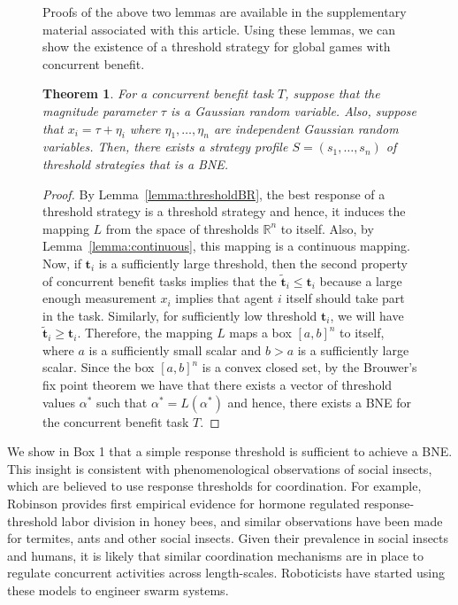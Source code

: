\documentclass{nature}
\newtheorem{theorem}{Theorem}
\def\R{\mathbb{R}}    %
\def\td{\mathbf{t}}   %
\begin{document}
\begin{figure}
\begin{framed}
Proofs of the above two lemmas are available in the supplementary material associated with this article. Using these lemmas, we can show the existence of a threshold strategy for global games with concurrent benefit. 
\begin{theorem}\label{thrm:mainthrm}
For a concurrent benefit task $T$, suppose that the magnitude parameter $\tau$ is a Gaussian random variable. Also, suppose that $x_i=\tau+\eta_i$ where $\eta_1,\ldots,\eta_n$ are independent Gaussian random variables. Then, there exists a strategy profile $S=(s_1,\ldots,s_n)$ of threshold strategies that is a BNE.
\end{theorem}
\begin{proof}
By Lemma~\ref{lemma:thresholdBR}, the best response of a threshold strategy is a threshold strategy and hence, it induces the mapping $L$ from the space of thresholds $\R^n$ to itself. Also, by Lemma~\ref{lemma:continuous}, this mapping is a continuous mapping. Now, if $\td_i$ is a sufficiently large threshold, then the second property of concurrent benefit tasks implies that the $\tilde{\td}_i\leq \td_i$ because a large enough measurement $x_i$ implies that agent $i$ itself should take part in the task. Similarly, for sufficiently low threshold $\td_i$, we will have $\tilde{\td}_i\geq \td_i$. Therefore, the mapping $L$ maps a box $[a,b]^n$ to itself, where $a$ is a sufficiently small scalar and $b>a$ is a sufficiently large scalar. Since the box $[a,b]^n$ is a convex closed set, by the Brouwer's fix point theorem\cite{Border1990} we have that there exists a vector of threshold values $\alpha^*$ such that $\alpha^*=L(\alpha^*)$ and hence, there exists a BNE for the concurrent benefit task $T$.
\end{proof}
\end{framed}
\end{figure}

\linenumbers
We show in Box 1 that a simple response threshold is sufficient to achieve a BNE. This insight is consistent with phenomenological observations of social insects, which are believed to use response thresholds for coordination. For example, Robinson\cite{Robinson1987} provides first empirical evidence for hormone regulated response-threshold labor division in honey bees, and similar observations have been made for termites, ants and other social insects\cite{Bonabeau1999,Camazine2001}. Given their prevalence in social insects and humans, it is likely that similar coordination mechanisms are in place to regulate concurrent activities across length-scales. 
%
%
Roboticists have started using these models to engineer swarm systems\cite{Bonabeau1996,Theraulaz1998,Krieger2000}. %
\end{document}
